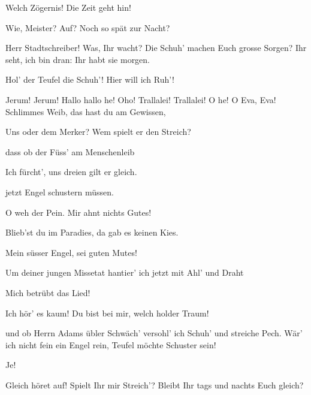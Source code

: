 \begin{drama}
\Waltherspeaks
Welch Zögernis! Die Zeit geht hin!

\Beckmesserspeaks


Wie, Meister? Auf? Noch so spät zur Nacht?

\Sachsspeaks
Herr Stadtschreiber! Was, Ihr wacht?
Die Schuh' machen Euch grosse Sorgen?
Ihr seht, ich bin dran:
Ihr habt sie morgen.



\Beckmesserspeaks


Hol' der Teufel die Schuh'! Hier will ich Ruh'!

\Sachsspeaks
Jerum! Jerum!
Hallo hallo he!
Oho! Trallalei! Trallalei! O he!
O Eva, Eva! Schlimmes Weib,
das hast du am Gewissen,

\Waltherspeaks


Uns oder dem Merker? Wem spielt er den Streich?

\Sachsspeaks
dass ob der Füss' am Menschenleib

\Evaspeaks


Ich fürcht', uns dreien
gilt er gleich.

\Sachsspeaks
jetzt Engel schustern müssen.

\Evaspeaks
O weh der Pein.
Mir ahnt nichts Gutes!

\Sachsspeaks
Blieb'st du im Paradies, da gab es keinen Kies.

\Waltherspeaks
Mein süsser Engel, sei guten Mutes!

\Sachsspeaks
Um deiner jungen Missetat
hantier' ich jetzt mit Ahl' und Draht

\Evaspeaks
Mich betrübt das Lied!

\Waltherspeaks
Ich hör' es kaum!
Du bist bei mir,
welch holder Traum!



\Sachsspeaks
und ob Herrn Adams übler Schwäch'
versohl' ich Schuh' und streiche Pech.
Wär' ich nicht fein ein Engel rein,
Teufel möchte Schuster sein!




\Sachsspeaks
Je!



\Beckmesserspeaks
Gleich höret auf!
Spielt Ihr mir Streich'?
Bleibt Ihr tags und nachts Euch gleich?


\end{drama}
